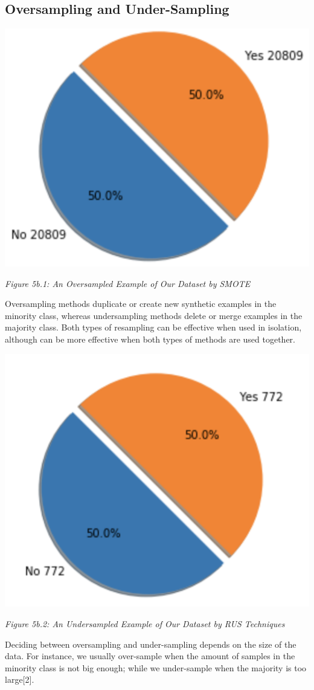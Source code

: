 \documentclass[12pt,journal]{IEEEtran}
\begin{document}
\subsection{Oversampling and Under-Sampling}
\begin{center}
	\includegraphics[width=.8\linewidth]{p3}
	
	\textit{Figure 5b.1: An Oversampled Example of Our Dataset by SMOTE}
\end{center}
Oversampling methods duplicate or create new synthetic examples in the minority class, whereas undersampling methods delete or merge examples in the majority class. Both types of resampling can be effective when used in isolation, although can be more effective when both types of methods are used together.

\begin{center}
	\includegraphics[width=.8\linewidth]{p2}
	
	\textit{Figure 5b.2: An Undersampled Example of Our Dataset by RUS Techniques}
\end{center}
Deciding between oversampling and under-sampling depends on the size of the data. For instance, we usually over-sample when the amount of samples in the minority class is not big enough; while we under-sample when the majority is too large[2].
\end{document}

